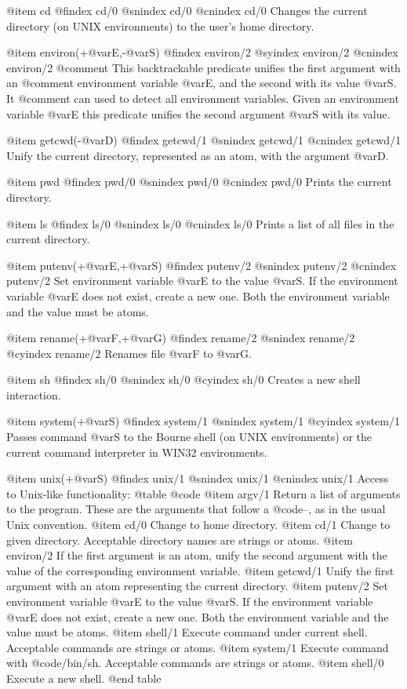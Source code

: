 {{{{{{@item cd
@findex cd/0
@snindex cd/0
@cnindex cd/0
Changes the current directory (on UNIX environments) to the user's home directory.

@item environ(+@var{E},-@var{S})
@findex environ/2
@syindex environ/2
@cnindex environ/2
@comment This backtrackable predicate unifies the first argument with an
@comment environment variable @var{E}, and the second with its value @var{S}. It
@comment can used to detect all environment variables.
    Given an environment variable @var{E} this predicate unifies the second argument @var{S} with its value.

@item getcwd(-@var{D})
@findex getcwd/1
@snindex getcwd/1
@cnindex getcwd/1
Unify the current directory, represented as an atom, with the argument
@var{D}.

@item pwd
@findex pwd/0
@snindex pwd/0
@cnindex pwd/0
Prints the current directory.

@item ls
@findex ls/0
@snindex ls/0
@cnindex ls/0
Prints a list of all files in the current directory.

@item putenv(+@var{E},+@var{S})
@findex putenv/2
@snindex putenv/2
@cnindex putenv/2
Set environment variable @var{E} to the value @var{S}. If the
environment variable @var{E} does not exist, create a new one. Both the
environment variable and the value must be atoms.

@item rename(+@var{F},+@var{G})
@findex rename/2
@snindex rename/2
@cyindex rename/2
Renames file @var{F} to @var{G}.

@item sh
@findex sh/0
@snindex sh/0
@cyindex sh/0
Creates a new shell interaction.

@item system(+@var{S})
@findex system/1
@snindex system/1
@cyindex system/1
Passes command @var{S} to the Bourne shell (on UNIX environments) or the
current command interpreter in WIN32 environments.

@item unix(+@var{S})
@findex unix/1
@snindex unix/1
@cnindex unix/1
Access to Unix-like functionality:
@table @code
@item argv/1
Return a list of arguments to the program. These are the arguments that
follow a @code{--}, as in the usual Unix convention.
@item cd/0
Change to home directory.
@item cd/1
Change to given directory. Acceptable directory names are strings or
atoms.
@item environ/2
If the first argument is an atom, unify the second argument with the
value of the corresponding environment variable.
@item getcwd/1
Unify the first argument with an atom representing the current directory.
@item putenv/2
Set environment variable @var{E} to the value @var{S}. If the
environment variable @var{E} does not exist, create a new one. Both the
environment variable and the value must be atoms.
@item shell/1
Execute command under current shell. Acceptable commands are strings or
atoms.
@item system/1
Execute command with @code{/bin/sh}. Acceptable commands are strings or
atoms.
@item shell/0
Execute a new shell.
@end table

}}}}}}
